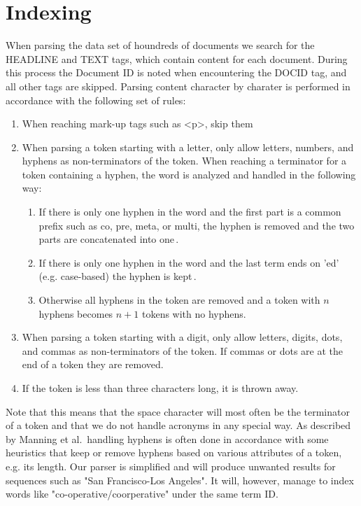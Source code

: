 
\section{Indexing}
\label{sec:indexing}
When parsing the data set of houndreds of documents we search for the HEADLINE and TEXT tags, which contain content for each document. During this process the Document ID is noted when encountering the DOCID tag, and all other tags are skipped. Parsing content character by charater is performed in accordance with the following set of rules:

\begin{enumerate}
	\item When reaching mark-up tags such as <p>, skip them
	\item When parsing a token starting with a letter, only allow letters, numbers, and hyphens as non-terminators of the token. When reaching a terminator for a token containing a hyphen, the word is analyzed and handled in the following way:
	\begin{enumerate}
		\item If there is only one hyphen in the word and the first part is a common prefix such as co, pre, meta, or multi, the hyphen is removed and the two parts are concatenated into one\,\cite{ibm13}\cite{grammar13}.
		\item If there is only one hyphen in the word and the last term ends on 'ed' (e.g. case-based) the hyphen is kept\,\cite{ibm13}.
		\item Otherwise all hyphens in the token are removed and a token with $n$ hyphens becomes $n+1$ tokens with no hyphens.
	\end{enumerate}
	\item When parsing a token starting with a digit, only allow letters, digits, dots, and commas as non-terminators of the token. If commas or dots are at the end of a token they are removed.
	\item If the token is less than three characters long, it is thrown away.
\end{enumerate}

Note that this means that the space character will most often be the terminator of a token and that we do not handle acronyms in any special way. As described by Manning et al.\,\cite[p. 24]{manning2008introduction} handling hyphens is often done in accordance with some heuristics that keep or remove hyphens based on various attributes of a token, e.g. its length. Our parser is simplified and will produce unwanted results for sequences such as "San Francisco-Los Angeles". It will, however, manage to index words like "co-operative/coorperative" under the same term ID.

